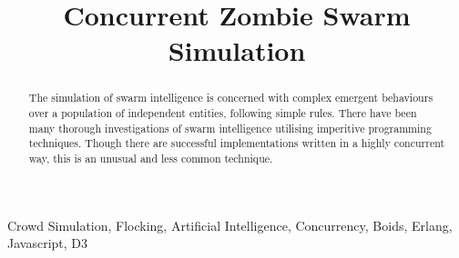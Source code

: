 \documentclass[10pt, a4paper, conference, compsocconf]{IEEEtran}
\begin{document}
\title{Concurrent Zombie Swarm Simulation}
\author{
\and
{}
\and
{}
}

\maketitle

\begin{abstract}
The simulation of swarm intelligence is concerned with complex emergent behaviours over a population of independent entities, following simple rules. There have been many thorough investigations of swarm intelligence utilising imperitive programming techniques. Though there are successful implementations written in a highly concurrent way, this is an unusual and less common technique.
\end{abstract}
\begin{IEEEkeywords}
Crowd Simulation, Flocking, Artificial Intelligence, Concurrency, Boids, Erlang, Javascript, D3
\end{IEEEkeywords}
\end{document}
